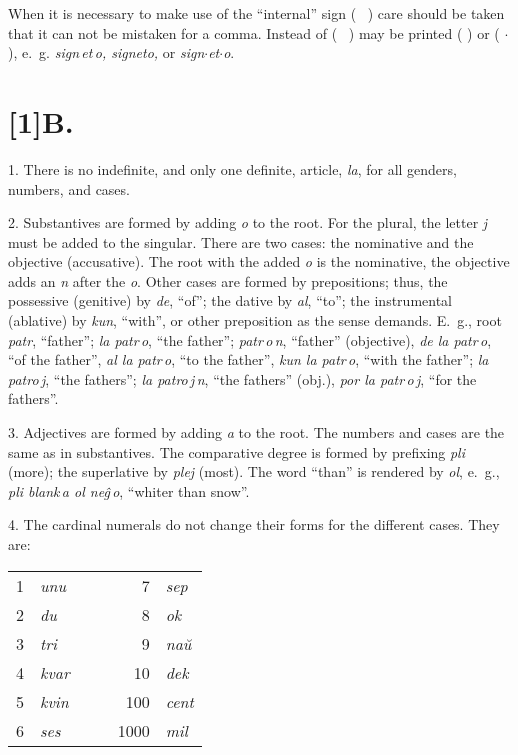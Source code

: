 \documentclass[12pt,twoside]{book}
\begin{document}
When it is necessary to make use of the ``internal'' sign ( \, ) care should be taken that it can not be mistaken for a comma.  Instead of ( \, ) may be printed ( \textquotesingle{} ) or ( $\cdot$ ), e.~g. \emph{sign\,et\,o, sign\textquotesingle{}et\textquotesingle{}o,} or \emph{sign$\cdot$et$\cdot$o}.

\section*{\scalebox{0.8}[1]B. \hspace{.2em} }

1. There is no indefinite, and only one definite, article, \emph{la}, for all genders, numbers, and cases.

2. Substantives are formed by adding \emph{o} to the root. For the plural, the letter \emph{j} must be added to the singular. There are two cases: the nominative and the objective (accusative). The root with the added \emph{o} is the nominative, the objective adds an \emph{n} after the \emph{o}. Other cases are formed by prepositions; thus, the possessive (genitive) by \emph{de}, “of”; the dative by \emph{al}, “to”; the instrumental (ablative) by \emph{kun}, “with”, or other preposition as the sense demands. E.~g., root \emph{patr}, “father”; \emph{la patr\,o}, “the father”; \emph{patr\,o\,n}, “father” (objective), \emph{de la patr\,o}, “of the father”, \emph{al la patr\,o}, “to the father”, \emph{kun la patr\,o}, “with the father”; \emph{la patro\,j}, “the fathers”; \emph{la patro\,j\,n}, “the fathers” (obj.), \emph{por la patr\,o\,j}, “for the fathers”.

3. Adjectives are formed by adding \emph{a} to the root. The numbers and cases are the same as in substantives. The comparative degree is formed by prefixing \emph{pli} (more); the superlative by \emph{plej} (most). The word “than” is rendered by \emph{ol}, e.~g., \emph{pli blank\,a ol neĝ\,o}, “whiter than snow”.

4. The cardinal numerals do not change their forms for the different cases. They are:

\begin{center}
\begin{tabular}{rlccrl}
1 & \emph{unu} & \hspace{2em} & \hspace{2em} & 7 & \emph{sep} \\
2 & \emph{du} & & & 8 & \emph{ok} \\
3 & \emph{tri} & & & 9 & \emph{naŭ} \\
4 & \emph{kvar} & & & 10 & \emph{dek} \\
5 & \emph{kvin} & & & 100 & \emph{cent} \\
6 & \emph{ses} & & & 1000 & \emph{mil} 
\end{tabular}
\end{center}
\end{document}
